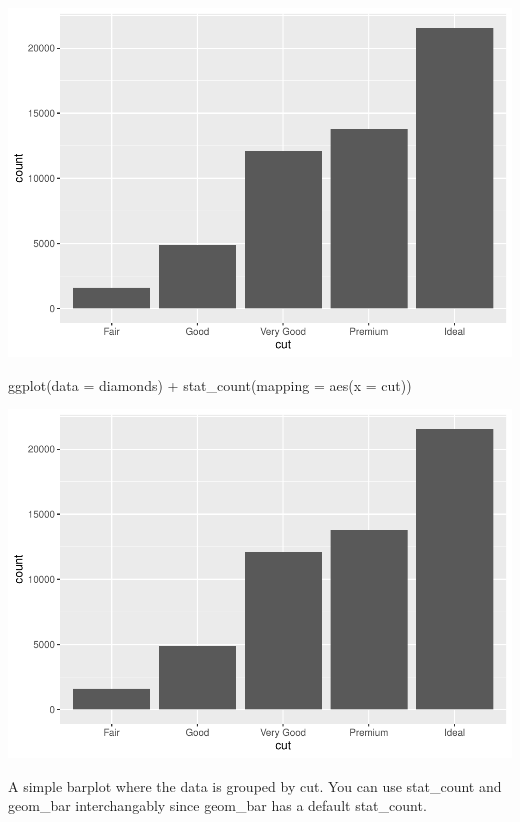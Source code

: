 \documentclass[
]{article}
\newenvironment{Shaded}{\begin{snugshade}}{\end{snugshade}}
\newcommand{\AttributeTok}[1]{\textcolor[rgb]{0.77,0.63,0.00}{#1}}
\newcommand{\FunctionTok}[1]{\textcolor[rgb]{0.00,0.00,0.00}{#1}}
\newcommand{\NormalTok}[1]{#1}
\newcommand{\SpecialCharTok}[1]{\textcolor[rgb]{0.00,0.00,0.00}{#1}}
\begin{document}
\includegraphics{Journal_files/figure-latex/unnamed-chunk-50-1.pdf}

\begin{Shaded}
\begin{Highlighting}[]
\FunctionTok{ggplot}\NormalTok{(}\AttributeTok{data =}\NormalTok{ diamonds) }\SpecialCharTok{+} 
  \FunctionTok{stat\_count}\NormalTok{(}\AttributeTok{mapping =} \FunctionTok{aes}\NormalTok{(}\AttributeTok{x =}\NormalTok{ cut))}
\end{Highlighting}
\end{Shaded}

\includegraphics{Journal_files/figure-latex/unnamed-chunk-50-2.pdf}

A simple barplot where the data is grouped by cut. You can use
stat\_count and geom\_bar interchangably since geom\_bar has a default
stat\_count.
\end{document}
